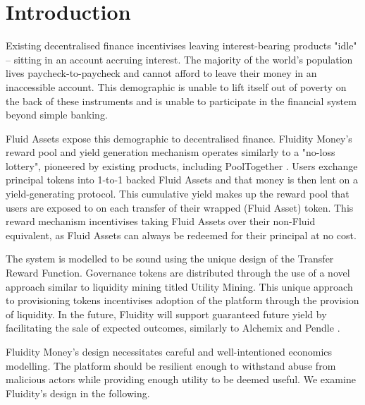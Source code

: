 \section{Introduction}

Existing decentralised finance incentivises leaving interest-bearing products "idle" -- sitting in an account accruing interest. The majority of the world's population lives paycheck-to-paycheck and cannot afford to leave their money in an inaccessible account. This demographic is unable to lift itself out of poverty on the back of these instruments and is unable to participate in the financial system beyond simple banking.

Fluid Assets expose this demographic to decentralised finance. Fluidity Money's reward pool and yield generation mechanism operates similarly to a "no-loss lottery", pioneered by existing products, including PoolTogether \cite{pool}. Users exchange principal tokens into 1-to-1 backed Fluid Assets and that money is then lent on a yield-generating protocol. This cumulative yield makes up the reward pool that users are exposed to on each transfer of their wrapped (Fluid Asset) token. This reward mechanism incentivises taking Fluid Assets over their non-Fluid equivalent, as Fluid Assets can always be redeemed for their principal at no cost.

The system is modelled to be sound using the unique design of the Transfer Reward Function. Governance tokens are distributed through the use of a novel approach similar to liquidity mining titled Utility Mining. This unique approach to provisioning tokens incentivises adoption of the platform through the provision of liquidity. In the future, Fluidity will support guaranteed future yield by facilitating the sale of expected outcomes, similarly to Alchemix \cite{alchemix} and Pendle \cite{pendle}.

Fluidity Money's design necessitates careful and well-intentioned economics modelling. The platform should be resilient enough to withstand abuse from malicious actors while providing enough utility to be deemed useful. We examine Fluidity's design in the following.